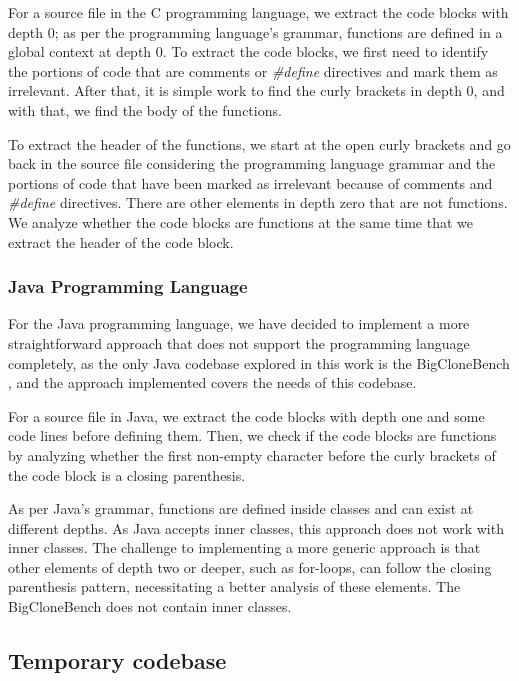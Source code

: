 For a source file in the C programming language, we extract the code blocks with depth 0; 
as per the programming language’s grammar, functions are defined in a global context at depth 0. 
To extract the code blocks, we first need to identify the portions of code that are comments or 
\textit{\#define} directives and mark them as irrelevant. After that, it is simple work to find 
the curly brackets in depth 0, and with that, we find the body of the functions.

To extract the header of the functions, we start at the open curly brackets and go back in the 
source file considering the programming language grammar and the portions of code that have been 
marked as irrelevant because of comments and \textit{\#define} directives.
There are other elements in depth zero that are not functions. We analyze whether the code blocks 
are functions at the same time that we extract the header of the code block.

\subsubsection{Java Programming Language}

For the Java programming language, we have decided to implement a more straightforward approach 
that does not support the programming language completely, as the only Java codebase explored in 
this work is the BigCloneBench \citep{bigclonebench}, and the approach implemented covers the 
needs of this codebase.

For a source file in Java, we extract the code blocks with depth one and some code lines before 
defining them. Then, we check if the code blocks are functions by analyzing whether the first 
non-empty character before the curly brackets of the code block is a closing parenthesis.

As per Java’s grammar, functions are defined inside classes and can exist at different depths. 
As Java accepts inner classes, this approach does not work with inner classes. The challenge 
to implementing a more generic approach is that other elements of depth two or deeper, such 
as for-loops, can follow the closing parenthesis pattern, necessitating a better analysis of 
these elements. The BigCloneBench \citep{bigclonebench} does not contain inner classes.

\subsection{Temporary codebase}

